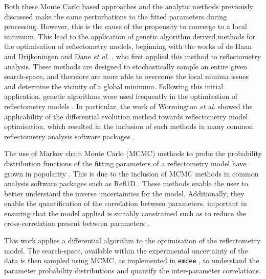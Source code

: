 Both these Monte Carlo based approaches and the analytic methods previously discussed make the same perturbations to the fitted parameters during processing.
However, this is the cause of the propensity to converge to a local minimum.
This lead to the application of genetic algorithm derived methods for the optimisation of reflectometry models, beginning with the works of de Haan and Drijkoningen \cite{de_haan_genetic_1994} and Dane \emph{et al.} \cite{dane_application_1998}, who first applied this method to reflectometry analysis.
These methods are designed to stochastically sample an entire given search-space, and therefore are more able to overcome the local minima issues and determine the vicinity of a global minimum.
Following this initial application, genetic algorithms were used frequently in the optimisation of reflectometry models \cite{ulyanenkov_genetic_2000,ulyanenkov_extended_2005,politsch_unbiased_2002,wormington_characterization_1999}.
In particular, the work of Wormington \emph{et al.} \cite{wormington_characterization_1999} showed the applicability of the differential evolution method towards reflectometry model optimisation, which resulted in the inclusion of such methods in many common reflectometry analysis software packages \cite{bjorck_fitting_2011,bjorck_genx_2007,nelson_co-refinement_2006,nelson_refnx_2019,ott_simulreflec_nodate,kienzle_ncnr_nodate}.

The use of Markov chain Monte Carlo (MCMC) methods to probe the probability distribution functions of the fitting parameters of a reflectometry model have grown in popularity \cite{gil_limitations_2012,hoogerheide_structure_2018,owejan_solid_2012,heinrich_myristoylation_2014}.
This is due to the inclusion of MCMC methods in common analysis software packages such as Refl1D \cite{kienzle_ncnr_nodate}.
These methods enable the user to better understand the inverse uncertainties for the model.
Additionally, they enable the quantification of the correlation between parameters, important in ensuring that the model applied is suitably constrained such as to reduce the cross-correlation present between parameters \cite{nelson_co-refinement_2006}.

This work applies a differential algorithm \cite{storn_differential_1997,jones_scipy_nodate} to the optimisation of the reflectometry model.
The search-space, available within the experimental uncertainty of the data is then sampled using MCMC, as implemented in \texttt{emcee} \cite{foreman-mackey_emcee_2013}, to understand the parameter probability distributions and quantify the inter-parameter correlations.

